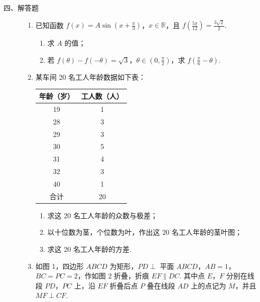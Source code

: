 \begin{description}

    \item[四、解答题]

    \begin{enumerate}[leftmargin=5pt]

      \addtocounter{enumi}{+15}

        \item 已知函数 \(f(x) = A \sin \left( x + \frac{\pi}{3} \right)\)，\(x \in \mathbb{R}\)，且 \(f\left( \frac{5\pi}{12} \right) = \frac{3\sqrt{2}}{2}\).

\begin{enumerate}
\item 求 \(A\) 的值；
\item 若 \(f(\theta) - f(-\theta) = \sqrt{3}\)，\(\theta \in \left(0, \frac{\pi}{2}\right)\)，求 \(f\left(\frac{\pi}{6} - \theta\right)\).
\end{enumerate}

        \item 某车间 20 名工人年龄数据如下表：

\begin{center}
\begin{tabular}{c|c}
\hline
年龄（岁） & 工人数（人） \\
\hline
19 & 1 \\
28 & 3 \\
29 & 3 \\
30 & 5 \\
31 & 4 \\
32 & 3 \\
40 & 1 \\
\hline
合计 & 20 \\
\hline
\end{tabular}
\end{center}

\begin{enumerate}
\item 求这 20 名工人年龄的众数与极差；
\item 以十位数为茎，个位数为叶，作出这 20 名工人年龄的茎叶图；
\item 求这 20 名工人年龄的方差.
\end{enumerate}

        \item 如图 1，四边形 \(ABCD\) 为矩形，\(PD \perp\) 平面 \(ABCD\)，\(AB = 1\)，\(BC = PC = 2\)，作如图 2 折叠，折痕 \(EF \parallel DC\). 其中点 \(E\)，\(F\) 分别在线段 \(PD\)，\(PC\) 上，沿 \(EF\) 折叠后点 \(P\) 叠在线段 \(AD\) 上的点记为 \(M\)，并且 \(MF \perp CF\).


\end{enumerate}
\end{description}
